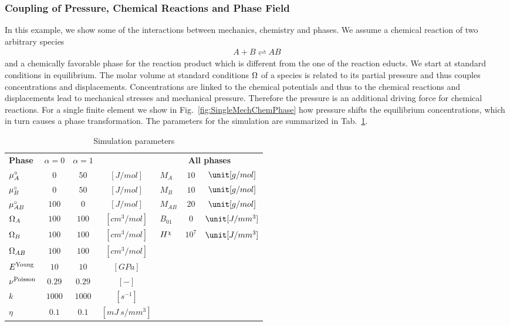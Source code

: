 \subsubsection{Coupling of Pressure, Chemical Reactions and Phase Field}
In this example, we show some of the interactions between mechanics, chemistry and phases. We assume a chemical reaction of two arbitrary species 
\begin{align}
  A + B \rightleftharpoons AB
\end{align}
and a chemically favorable phase for the reaction product which is different from the one of the reaction educts. We start at standard conditions in equilibrium. The molar volume at standard conditions $\Omega$ of a species is related to its partial pressure and thus couples concentrations and displacements. Concentrations are linked to the chemical potentials and thus to the chemical reactions and displacements lead to mechanical stresses and mechanical pressure. Therefore the pressure is an additional driving force for chemical reactions. For a single finite element we show in Fig.~\ref{fig:SingleMechChemPhase} how  pressure shifts the equilibrium concentrations, which in turn causes a phase transformation. The parameters for the simulation are summarized in Tab.~{\ref{tab:singleBlockMechChemPhase}}.
\begin{table}[h!]
  \caption{Simulation parameters}
  \centering
  \begin{tabular}{  l c c c | l c c  }
    \hline
    \rowcolor{gray2}
                        \textbf{Phase} & $\alpha=0$  & $\alpha=1$ & & \multicolumn{3}{c}{\textbf{All phases}} \\
    \rowcolor{gray1}
    $\mu^{\circ}_A$         & $0$    & $50$   & $\unit{[J/mol]}$     & $M_A$    & $10$   & $\unit[g/mol]$ \\ 
    $\mu^{\circ}_B$         & $0$    & $50$   & $\unit{[J/mol]}$     & $M_B$    & $10$   & $\unit[g/mol]$ \\
    \rowcolor{gray1}
    $\mu^{\circ}_{AB}$      & $100$  & $ 0$   & $\unit{[J/mol]}$     & $M_{AB}$ & $20$   & $\unit[g/mol]$ \\
    $\Omega_A$      & $100$  & $100$  & $\unit{[cm^3/mol]}$  & $B_{01}$ & $0$    & $\unit[J/mm^3]$ \\ 
    \rowcolor{gray1}
    $\Omega_B$      & $100$  & $100$  & $\unit{[cm^3/mol]}$  & $H^{\chi} $ & $10^7$ & $\unit[J/mm^3]$ \\ 
    $\Omega_{AB}$   & $100$  & $100$  & $\unit{[cm^3/mol]}$  & & & \\ 
    \rowcolor{gray1}
    $E^{\rm Young}$     & $10$   & $10$   & $\unit{[GPa]}$       & & & \\
    $\nu^{\rm Poisson}$ & $0.29$ & $0.29$ & $ [-] $              & & & \\
    \rowcolor{gray1}
    $k$                 & $1000$ & $1000$ & $\unit{[s^{-1}]}$    & & & \\
    $\eta$              & $0.1$  & $0.1$  & $\unit{[mJ \ s/mm^3]}$ & & & \\
    \hline
  \end{tabular} 
  \label{tab:singleBlockMechChemPhase}
\end{table}

